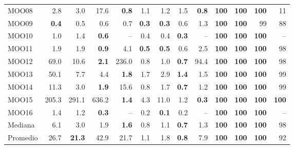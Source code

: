 \begin{table}[!htbp]
{\begin{tabular}{l rrrr | rrrr | rrrr}
MOO08 & 2.8 & 3.0 & 17.6 & \textbf{0.8} & 1.1 & 1.2 & 1.5 & \textbf{0.8} & \textbf{100} & \textbf{100} & \textbf{100} & 11 \\
MOO09 & \textbf{0.4} & 0.5 & 0.6 & 0.7 & \textbf{0.3} & \textbf{0.3} & 0.6 & 1.3 & \textbf{100} & \textbf{100} & 99 & 88 \\
MOO10 & 1.0 & 1.4 & \textbf{0.6} & -- & 0.4 & 0.4 & \textbf{0.3} & -- & \textbf{100} & \textbf{100} & \textbf{100} & -- \\
MOO11 & 1.9 & 1.9 & \textbf{0.9} & 4.1 & \textbf{0.5} & \textbf{0.5} & 0.6 & 2.5 & \textbf{100} & \textbf{100} & \textbf{100} & 98 \\
MOO12 & 69.0 & 10.6 & \textbf{2.1} & 236.0 & 0.8 & 1.0 & \textbf{0.7} & 94.4 & \textbf{100} & \textbf{100} & \textbf{100} & 98 \\
MOO13 & 50.1 & 7.7 & 4.4 & \textbf{1.8} & 1.7 & 2.9 & \textbf{1.4} & 1.5 & \textbf{100} & \textbf{100} & \textbf{100} & 99 \\
MOO14 & 11.3 & 3.0 & \textbf{1.9} & 15.6 & 0.8 & 1.7 & \textbf{0.7} & 1.2 & \textbf{100} & \textbf{100} & \textbf{100} & 99 \\
MOO15 & 205.3 & 291.1 & 636.2 & \textbf{1.4} & 4.3 & 11.0 & 1.2 & \textbf{0.3} & \textbf{100} & \textbf{100} & \textbf{100} & \textbf{100} \\
MOO16 & 1.4 & 1.2 & \textbf{0.3} & -- & 0.2 & \textbf{0.1} & 0.2 & -- & \textbf{100} & \textbf{100} & \textbf{100} & -- \\
\midrule
Mediana & 6.1 & 3.0 & 1.9 & \textbf{1.6} & 0.8 & 1.1 & \textbf{0.7} & 1.3 & \textbf{100} & \textbf{100} & \textbf{100} & 98 \\
Promedio & 26.7 & \textbf{21.3} & 42.9 & 21.7 & 1.1 & 1.8 & \textbf{0.8} & 7.9 & \textbf{100} & \textbf{100} & \textbf{100} & 92 \\
\bottomrule
\end{tabular}
}
\end{table}

